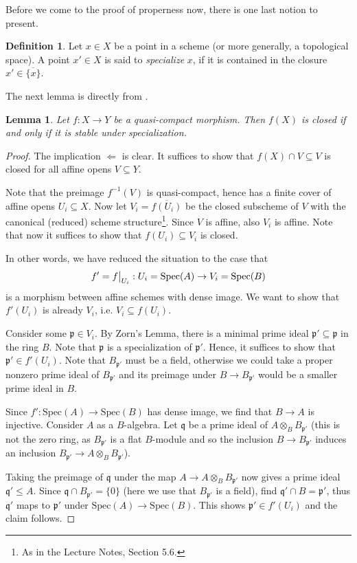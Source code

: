 \documentclass{scrartcl}
\newcommand{\p}{\mathfrak{p}}
\newcommand{\q}{\mathfrak{q}}
\newcommand{\Spec}{\mathrm{Spec}}
\newcommand\restr[2]{{
    \left.\kern-\nulldelimiterspace
    #1
    \vphantom{\big|}
    \right|_{#2}
}}
\newtheorem{lemma}[subsection]{Lemma}
\theoremstyle{definition}
\newtheorem{definition}[subsection]{Definition}
\begin{document}
Before we come to the proof of properness now, there is one last notion to present.
\begin{definition}
    Let $x \in X$ be a point in a scheme (or more generally, a topological space).
    A point $x' \in X$ is said to \emph{specialize} $x$, if it is contained in the closure $x' \in \overline{\{x\}}$.
\end{definition}
The next lemma is directly from \cite[II.4.5]{hartshorne}.
\begin{lemma}
    \label{prop:im_closed_iff_stable_specialization}
    Let $f: X \to Y$ be a quasi-compact morphism.
    Then $f(X)$ is closed if and only if it is stable under specialization.
\end{lemma}
\begin{proof}
    The implication $\Leftarrow$ is clear.
    It suffices to show that $f(X) \cap V \subseteq V$ is closed for all affine opens $V \subseteq Y$.
    
    Note that the preimage $f^{-1}(V)$ is quasi-compact, hence has a finite cover of affine opens $U_i \subseteq X$.
    Now let $V_i = \overline{f(U_i)}$ be the closed subscheme of $V$ with the canonical (reduced) scheme structure\footnote{As in the Lecture Notes, Section 5.6.}.
    Since $V$ is affine, also $V_i$ is affine.
    Note that now it suffices to show that $f(U_i) \subseteq V_i$ is closed.

    In other words, we have reduced the situation to the case that
    \begin{equation*}
        f' = \restr{f}{U_i}: U_i = \Spec(A) \to V_i = \Spec(B)
    \end{equation*}
    is a morphism between affine schemes with dense image.
    We want to show that $f'(U_i)$ is already $V_i$, i.e. $V_i \subseteq f(U_i)$.

    Consider some $\p \in V_i$.
    By Zorn's Lemma, there is a minimal prime ideal $\p' \subseteq \p$ in the ring $B$.
    Note that $\p$ is a specialization of $\p'$.
    Hence, it suffices to show that $\p' \in f'(U_i)$.
    Note that $B_{\p'}$ must be a field, otherwise we could take a proper nonzero prime ideal of $B_{\p'}$ and its preimage under $B \to B_{\p'}$ would be a smaller prime ideal in $B$.

    Since $f': \Spec(A) \to \Spec(B)$ has dense image, we find that $B \to A$ is injective.
    Consider $A$ as a $B$-algebra.
    Let $\q$ be a prime ideal of $A \otimes_B B_{\p'}$ (this is not the zero ring, as $B_{\p'}$ is a flat $B$-module and so the inclusion $B \to B_{\p'}$ induces an inclusion $B_{\p'} \to A \otimes_B B_{\p'}$).

    Taking the preimage of $\q$ under the map $A \to A \otimes_B B_{\p'}$ now gives a prime ideal $\q' \leq A$.
    Since $\q \cap B_{\p'} = \{ 0 \}$ (here we use that $B_{\p'}$ is a field), find $\q' \cap B = \p'$, thus $\q'$ maps to $\p'$ under $\Spec(A) \to \Spec(B)$.
    This shows $\p' \in f'(U_i)$ and the claim follows.
\end{proof}
\end{document}
